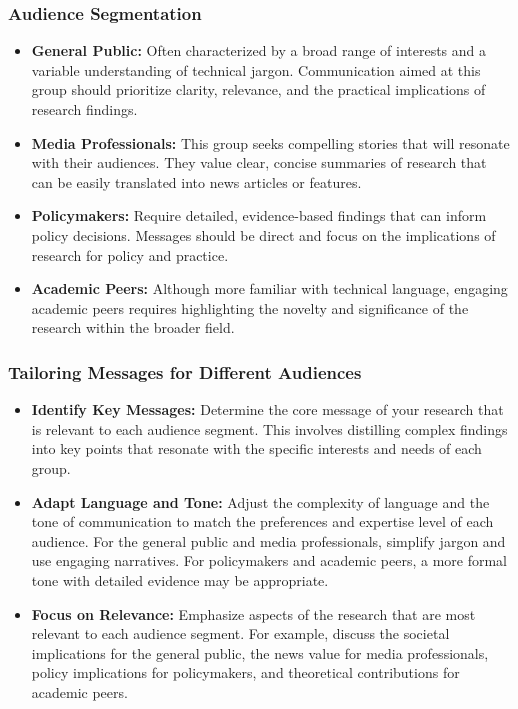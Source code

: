 \documentclass[
]{book}
\providecommand{\tightlist}{%
  \setlength{\itemsep}{0pt}\setlength{\parskip}{0pt}}
\begin{document}
\hypertarget{audience-segmentation}{%
\subsubsection{Audience Segmentation}\label{audience-segmentation}}

\begin{itemize}
\tightlist
\item
  \textbf{General Public:} Often characterized by a broad range of interests and a variable understanding of technical jargon. Communication aimed at this group should prioritize clarity, relevance, and the practical implications of research findings.
\item
  \textbf{Media Professionals:} This group seeks compelling stories that will resonate with their audiences. They value clear, concise summaries of research that can be easily translated into news articles or features.
\item
  \textbf{Policymakers:} Require detailed, evidence-based findings that can inform policy decisions. Messages should be direct and focus on the implications of research for policy and practice.
\item
  \textbf{Academic Peers:} Although more familiar with technical language, engaging academic peers requires highlighting the novelty and significance of the research within the broader field.
\end{itemize}

\hypertarget{tailoring-messages-for-different-audiences}{%
\subsubsection{Tailoring Messages for Different Audiences}\label{tailoring-messages-for-different-audiences}}

\begin{itemize}
\tightlist
\item
  \textbf{Identify Key Messages:} Determine the core message of your research that is relevant to each audience segment. This involves distilling complex findings into key points that resonate with the specific interests and needs of each group.
\item
  \textbf{Adapt Language and Tone:} Adjust the complexity of language and the tone of communication to match the preferences and expertise level of each audience. For the general public and media professionals, simplify jargon and use engaging narratives. For policymakers and academic peers, a more formal tone with detailed evidence may be appropriate.
\item
  \textbf{Focus on Relevance:} Emphasize aspects of the research that are most relevant to each audience segment. For example, discuss the societal implications for the general public, the news value for media professionals, policy implications for policymakers, and theoretical contributions for academic peers.
\end{itemize}
\end{document}
